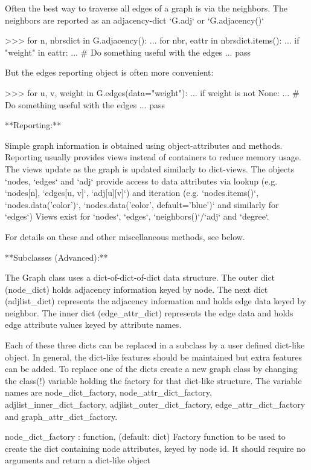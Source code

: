 \begin{DoxyVerb}
Often the best way to traverse all edges of a graph is via the neighbors.
The neighbors are reported as an adjacency-dict `G.adj` or `G.adjacency()`

>>> for n, nbrsdict in G.adjacency():
...     for nbr, eattr in nbrsdict.items():
...         if "weight" in eattr:
...             # Do something useful with the edges
...             pass

But the edges reporting object is often more convenient:

>>> for u, v, weight in G.edges(data="weight"):
...     if weight is not None:
...         # Do something useful with the edges
...         pass

**Reporting:**

Simple graph information is obtained using object-attributes and methods.
Reporting usually provides views instead of containers to reduce memory
usage. The views update as the graph is updated similarly to dict-views.
The objects `nodes, `edges` and `adj` provide access to data attributes
via lookup (e.g. `nodes[n], `edges[u, v]`, `adj[u][v]`) and iteration
(e.g. `nodes.items()`, `nodes.data('color')`,
`nodes.data('color', default='blue')` and similarly for `edges`)
Views exist for `nodes`, `edges`, `neighbors()`/`adj` and `degree`.

For details on these and other miscellaneous methods, see below.

**Subclasses (Advanced):**

The Graph class uses a dict-of-dict-of-dict data structure.
The outer dict (node_dict) holds adjacency information keyed by node.
The next dict (adjlist_dict) represents the adjacency information and holds
edge data keyed by neighbor.  The inner dict (edge_attr_dict) represents
the edge data and holds edge attribute values keyed by attribute names.

Each of these three dicts can be replaced in a subclass by a user defined
dict-like object. In general, the dict-like features should be
maintained but extra features can be added. To replace one of the
dicts create a new graph class by changing the class(!) variable
holding the factory for that dict-like structure. The variable names are
node_dict_factory, node_attr_dict_factory, adjlist_inner_dict_factory,
adjlist_outer_dict_factory, edge_attr_dict_factory and graph_attr_dict_factory.

node_dict_factory : function, (default: dict)
    Factory function to be used to create the dict containing node
    attributes, keyed by node id.
    It should require no arguments and return a dict-like object


\end{DoxyVerb}
